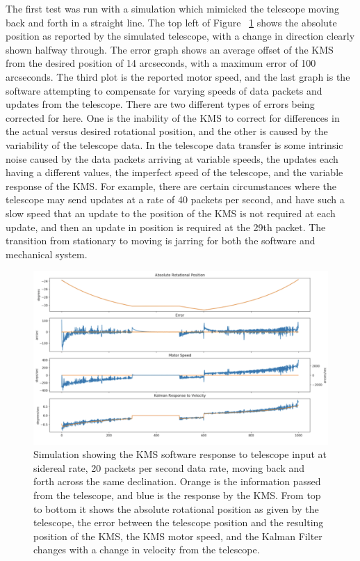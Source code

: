\documentclass[manuscript]{aastex}
\begin{document}
The first test was run with a simulation which mimicked the telescope moving back and forth in a straight line. The top left of Figure ~\ref{fig:km7} shows the absolute position as reported by the simulated telescope, with a change in direction clearly shown halfway through. The error graph shows an average offset of the KMS from the desired position of 14 arcseconds, with a maximum error of 100 arcseconds. The third plot is the reported motor speed, and the last graph is the software attempting to compensate for varying speeds of data packets and updates from the telescope. There are two different types of errors being corrected for here. One is the inability of the KMS to correct for differences in the actual versus desired rotational position, and the other is caused by the variability of the telescope data. In the telescope data transfer is some intrinsic noise caused by the data packets arriving at variable speeds, the updates each having a different values, the imperfect speed of the telescope, and the variable response of the KMS. For example, there are certain circumstances where the telescope may send updates at a rate of 40 packets per second, and have such a slow speed that an update to the position of the KMS is not required at each update, and then an update in position is required at the 29th packet. The transition from stationary to moving is jarring for both the software and mechanical system. 

\begin{figure}[H]
	\centering
	\captionsetup{width=\textwidth}
	\includegraphics[width=\textwidth]{km7.png}%
	\caption[Simulated KMS Performance, Simple Rastering Scan]{Simulation showing the KMS software response to telescope input at sidereal rate, 20 packets per second data rate, moving back and forth across the same declination. Orange is the information passed from the telescope, and blue is the response by the KMS. From top to bottom it shows the absolute rotational position as given by the telescope, the error between the telescope position and the resulting position of the KMS, the KMS motor speed, and the Kalman Filter changes with a change in velocity from the telescope.}%
	\label{fig:km7}%
\end{figure}
\end{document}

